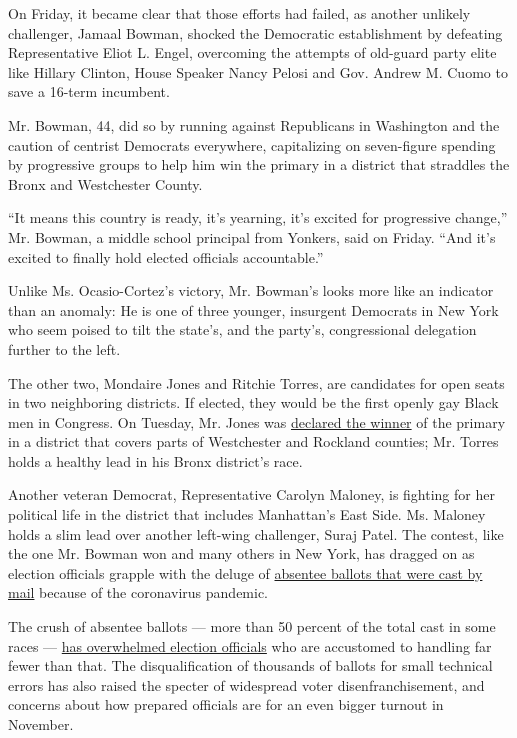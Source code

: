 On Friday, it became clear that those efforts had failed, as another
unlikely challenger, Jamaal Bowman, shocked the Democratic establishment
by defeating Representative Eliot L. Engel, overcoming the attempts of
old-guard party elite like Hillary Clinton, House Speaker Nancy Pelosi
and Gov. Andrew M. Cuomo to save a 16-term incumbent.

Mr. Bowman, 44, did so by running against Republicans in Washington and
the caution of centrist Democrats everywhere, capitalizing on
seven-figure spending by progressive groups to help him win the primary
in a district that straddles the Bronx and Westchester County.

``It means this country is ready, it's yearning, it's excited for
progressive change,'' Mr. Bowman, a middle school principal from
Yonkers, said on Friday. ``And it's excited to finally hold elected
officials accountable.''

Unlike Ms. Ocasio-Cortez's victory, Mr. Bowman's looks more like an
indicator than an anomaly: He is one of three younger, insurgent
Democrats in New York who seem poised to tilt the state's, and the
party's, congressional delegation further to the left.

The other two, Mondaire Jones and Ritchie Torres, are candidates for
open seats in two neighboring districts. If elected, they would be the
first openly gay Black men in Congress. On Tuesday, Mr. Jones was
\href{https://www.nytimes3xbfgragh.onion/2020/07/14/nyregion/mondaire-jones-house-primary.html}{declared
the winner} of the primary in a district that covers parts of
Westchester and Rockland counties; Mr. Torres holds a healthy lead in
his Bronx district's race.

Another veteran Democrat, Representative Carolyn Maloney, is fighting
for her political life in the district that includes Manhattan's East
Side. Ms. Maloney holds a slim lead over another left-wing challenger,
Suraj Patel. The contest, like the one Mr. Bowman won and many others in
New York, has dragged on as election officials grapple with the deluge
of
\href{https://www.nytimes3xbfgragh.onion/2020/08/03/nyregion/nyc-mail-ballots-voting.html}{absentee
ballots that were cast by mail} because of the coronavirus pandemic.

The crush of absentee ballots --- more than 50 percent of the total cast
in some races ---
\href{https://www.nytimes3xbfgragh.onion/2020/07/17/nyregion/election-absentee-ballots-primary.html}{has
overwhelmed election officials} who are accustomed to handling far fewer
than that. The disqualification of thousands of ballots for small
technical errors has also raised the specter of widespread voter
disenfranchisement, and concerns about how prepared officials are for an
even bigger turnout in November.

